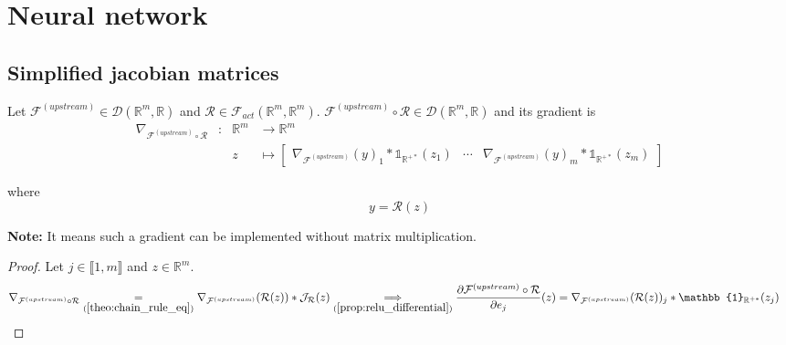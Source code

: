 \documentclass[11pt,en]{elegantpaper}
\newcommand{\Real}{\mathbb{R}}
\begin{document}
\section{Neural network}

\subsection{Simplified jacobian matrices}

\begin{proposition}
  {\normalfont
    Let $\mathcal{F}^{(upstream)} \in \mathcal{D}(\Real^m,\Real)$ and
    $\mathcal{R} \in \mathcal{F}_{act}(\Real^m,\Real^m)$.
    $\mathcal{F}^{(upstream)} \circ \mathcal{R} \in \mathcal{D}(\Real^m,\Real)$ and its gradient is \begin{equation} \label{prop:relu_simplified_differential}
      \begin{array}{llll}
        \nabla_{\mathcal{F}^{(upstream)} \circ \mathcal{R}} & : & \Real^m  & \longrightarrow \Real^m \\
        &   & z & \longmapsto \begin{bmatrix}
          \nabla_{\mathcal{F}^{(upstream)}}(y)_1 * \mathbb{1}_{\Real^{+*}}(z_1) & \cdots &
            \nabla_{\mathcal{F}^{(upstream)}}(y)_m * \mathbb{1}_{\Real^{+*}}(z_m)
        \end{bmatrix}
      \end{array}
    \end{equation} \par
    where \begin{equation*}
      y = \mathcal{R}(z)
    \end{equation*}

    \textbf{Note:} It means such a gradient can be implemented without matrix multiplication.
  }
\end{proposition}

\begin{proof}
  Let $j \in \llbracket 1,m \rrbracket$ and $z \in \Real^m$.
  \begin{equation*}
    \begin{split}
      \nabla_{\mathcal{F}^{(upstream)} \circ \mathcal{R}} \underset{(\ref{theo:chain_rule_eq})}{=}
        \nabla_{\mathcal{F}^{(upstream)}}(\mathcal{R}(z)) * \mathcal{J}_{\mathcal{R}}(z) &
      \underset{(\ref{prop:relu_differential})}\implies \frac{\partial \mathcal{F}^{(upstream)} \circ \mathcal{R}}{\partial e_j}(z)
        = \nabla_{\mathcal{F}^{(upstream)}}(\mathcal{R}(z))_j * \mathbb{1}_{\Real^{+*}}(z_j)
    \end{split}
  \end{equation*}
\end{proof}
\end{document}
